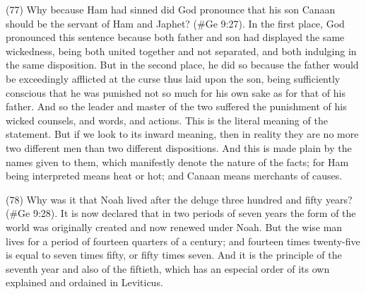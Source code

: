 (77) Why because Ham had sinned did God pronounce that his son Canaan should be the servant
of Ham and Japhet? (\#Ge 9:27). In the first place, God pronounced this sentence because
both father and son had displayed the same wickedness, being both united together and not
separated, and both indulging in the same disposition. But in the second place, he did so because
the father would be exceedingly afflicted at the curse thus laid upon the son, being sufficiently
conscious that he was punished not so much for his own sake as for that of his father. And so the
leader and master of the two suffered the punishment of his wicked counsels, and words, and
actions. This is the literal meaning of the statement. But if we look to its inward meaning, then in
reality they are no more two different men than two different dispositions. And this is made plain by
the names given to them, which manifestly denote the nature of the facts; for Ham being
interpreted means heat or hot; and Canaan means merchants of causes.

(78) Why was it that Noah lived after the deluge three hundred and fifty years? (\#Ge 9:28). It
is now declared that in two periods of seven years the form of the world was originally created and
now renewed under Noah. But the wise man lives for a period of fourteen quarters of a century;
and fourteen times twenty-five is equal to seven times fifty, or fifty times seven. And it is the
principle of the seventh year and also of the fiftieth, which has an especial order of its own
explained and ordained in Leviticus.

